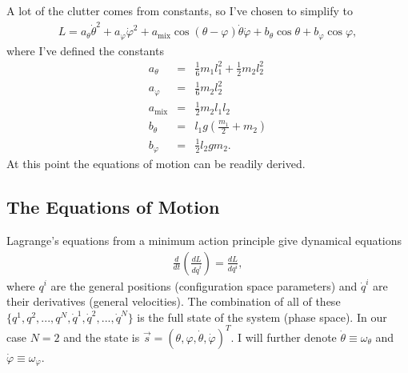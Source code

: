 \documentclass[a4paper]{article}
\begin{document}
	A lot of the clutter comes from constants, so I've chosen to simplify to
	\begin{eqnarray}\label{simplified_Lagrangian}
		L = a_{\theta}\dot{\theta}^2 + a_{\varphi}\dot{\varphi}^2 + a_{\mathrm{mix}}\cos( \theta - \varphi )\dot{\theta}\dot{\varphi} + b_{\theta}\cos{\theta} + b_{\varphi}\cos{\varphi},		
	\end{eqnarray}
	where I've defined the constants
	\begin{eqnarray}\label{a_th_def}
		a_{\theta} &=& \frac{1}{6}m_1 l_1^2 + \frac{1}{2}m_2 l_2^2 \\ \label{a_phi_def}
		a_{\varphi} &=& \frac{1}{6}m_2 l_2^2 \\ \label{a_mix_def}
		a_{\mathrm{mix}} &=& \frac{1}{2}m_2 l_1 l_2 \\ \label{b_th_def}
		b_{\theta} &=& l_1 g \left( \frac{m_1}{2} + m_2 \right) \\ \label{b_phi_def}
		b_{\varphi} &=& \frac{1}{2} l_2 g m_2.
	\end{eqnarray}
	At this point the equations of motion can be readily derived.
	
	\subsection{The Equations of Motion}\label{EoM_subsection}
	Lagrange's equations from a minimum action principle give dynamical equations
	\begin{eqnarray}\label{Lagrange_Equations}
		\frac{d}{dt}\left(\frac{d L}{d \dot{q}^i} \right) = \frac{dL}{dq^i},
	\end{eqnarray}
	where $q^i$ are the general positions (configuration space parameters) and $\dot{q}^i$ are their derivatives (general velocities).
	The combination of all of these $\{ q^1, q^2, ... , q^N, \dot{q}^1, \dot{q}^2, ... , \dot{q}^N \}$ is the full state of the system (phase space).
	In our case $N = 2$ and the state is $\vec{s} = ( \theta , \varphi , \dot{\theta} , \dot{\varphi} )^T$.
	I will further denote $\dot{\theta} \equiv \omega_{\theta}$ and $\dot{\varphi} \equiv \omega_{\varphi}$.
	
\end{document}
